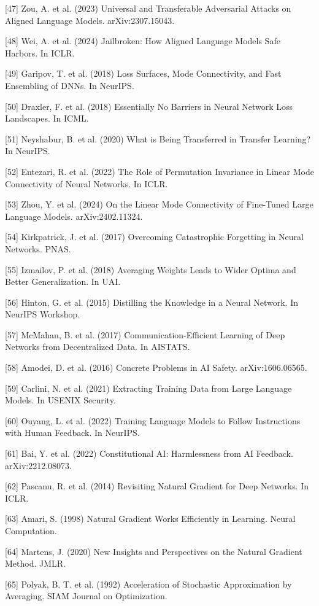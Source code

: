 \documentclass{article}
\begin{document}
{[47] Zou, A. et al. (2023) Universal and Transferable Adversarial Attacks on Aligned Language Models. arXiv:2307.15043.

[48] Wei, A. et al. (2024) Jailbroken: How Aligned Language Models Safe Harbors. In ICLR.

[49] Garipov, T. et al. (2018) Loss Surfaces, Mode Connectivity, and Fast Ensembling of DNNs. In NeurIPS.

[50] Draxler, F. et al. (2018) Essentially No Barriers in Neural Network Loss Landscapes. In ICML.

[51] Neyshabur, B. et al. (2020) What is Being Transferred in Transfer Learning? In NeurIPS.

[52] Entezari, R. et al. (2022) The Role of Permutation Invariance in Linear Mode Connectivity of Neural Networks. In ICLR.

[53] Zhou, Y. et al. (2024) On the Linear Mode Connectivity of Fine-Tuned Large Language Models. arXiv:2402.11324.

[54] Kirkpatrick, J. et al. (2017) Overcoming Catastrophic Forgetting in Neural Networks. PNAS.

[55] Izmailov, P. et al. (2018) Averaging Weights Leads to Wider Optima and Better Generalization. In UAI.

[56] Hinton, G. et al. (2015) Distilling the Knowledge in a Neural Network. In NeurIPS Workshop.

[57] McMahan, B. et al. (2017) Communication-Efficient Learning of Deep Networks from Decentralized Data. In AISTATS.

[58] Amodei, D. et al. (2016) Concrete Problems in AI Safety. arXiv:1606.06565.

[59] Carlini, N. et al. (2021) Extracting Training Data from Large Language Models. In USENIX Security.

[60] Ouyang, L. et al. (2022) Training Language Models to Follow Instructions with Human Feedback. In NeurIPS.

[61] Bai, Y. et al. (2022) Constitutional AI: Harmlessness from AI Feedback. arXiv:2212.08073.

[62] Pascanu, R. et al. (2014) Revisiting Natural Gradient for Deep Networks. In ICLR.

[63] Amari, S. (1998) Natural Gradient Works Efficiently in Learning. Neural Computation.

[64] Martens, J. (2020) New Insights and Perspectives on the Natural Gradient Method. JMLR.

[65] Polyak, B. T. et al. (1992) Acceleration of Stochastic Approximation by Averaging. SIAM Journal on Optimization.

}
\end{document}
